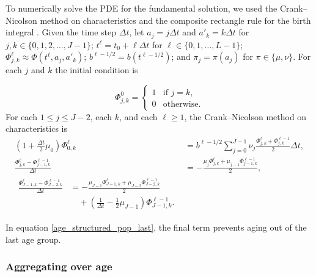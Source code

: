 \documentclass{jpmarticle}
\let\subequationsorig\subequations%
\let\endsubequationsorig\endsubequations%
\renewenvironment{subequations}{
  \subequationsorig
  \renewcommand{\theequation}{\theparentequation.\arabic{equation}}
}{
  \endsubequationsorig
}
\begin{document}
To numerically solve the PDE for the fundamental solution, we used the
Crank--Nicolson method on characteristics and the composite rectangle
rule for the birth integral \autocite{milner_1992}.  Given the time
step $\Delta t$, let $a_j = j \Delta t$ and $a'_k = k \Delta t$ for
$j, k \in \{0, 1, 2, \ldots, J - 1\}$;
$t^{\ell} = t_0 + \ell \Delta t$ for
$\ell \in \{0, 1, \ldots, L - 1\}$;
$\Phi_{j, k}^{\ell} \approx \Phi(t^{\ell}, a_j, a'_k)$;
$b^{\ell - 1 / 2} = b(t^{\ell - 1 / 2})$; and
$\pi_j = \pi(a_j)$ for $\pi \in \{\mu, \nu\}$.
For each $j$ and $k$ the initial condition is
\begin{subequations}
  \label{numerics_age_structured_fundamental}
  \begin{equation}
    \Phi_{j, k}^0 =
    \begin{cases}
      1 & \text{if $j = k$}, \\
      0 & \text{otherwise}.
    \end{cases}
  \end{equation}
  For each $1 \leq j \leq J - 2$, each $k$, and each $\ell
  \geq 1$, the Crank--Nicolson method on characteristics is
  \begin{align}
    \left(1 + \frac{\Delta t}{2} \mu_0\right)
    \Phi_{0, k}^{\ell}
    &= b^{\ell - 1 / 2}
    \sum_{j = 0}^{J - 1}
    \nu_j \frac{\Phi_{j, k}^{\ell} + \Phi_{j, k}^{\ell - 1}}{2}
    \Delta t,
    \\
    \frac{\Phi_{j, k}^{\ell} - \Phi_{j - 1, k}^{\ell - 1}}{\Delta t}
    &= - \frac{\mu_j \Phi_{j, k}^{\ell}
      + \mu_{j - 1} \Phi_{j - 1, k}^{\ell - 1}}{2},
    \\
    \begin{split}
      \frac{\Phi_{J - 1, k}^{\ell} - \Phi_{J - 2, k}^{\ell - 1}}{\Delta t}
      &= - \frac{\mu_{J - 1} \Phi_{J - 1, k}^{\ell}
        + \mu_{J - 2} \Phi_{J - 2, k}^{\ell - 1}}{2}
      \\
      & \quad {}
      + \left(\frac{1}{\Delta t} - \frac{1}{2} \mu_{J - 1}\right)
      \Phi_{J - 1, k}^{\ell - 1}.
    \end{split}
    \label{age_structured_pop_last}
  \end{align}
\end{subequations}
In equation \eqref{age_structured_pop_last}, the final term prevents
aging out of the last age group.


\subsubsection{Aggregating over age}
\end{document}
